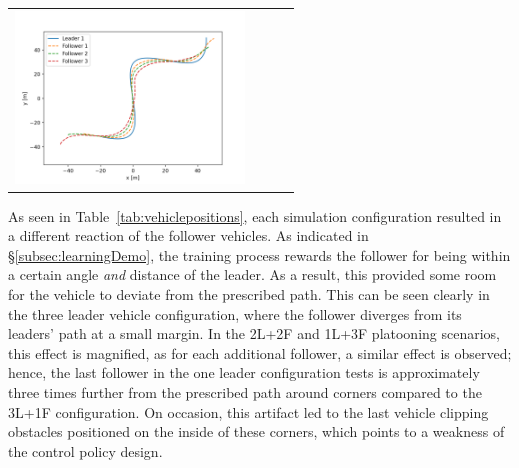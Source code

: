 \documentclass[12pt,twocolumn]{article}
\begin{document}
\begin{table}
\begin{tabular} { cccc }
        \parbox[c]{2.02in}{\includegraphics[height=1.8in]{Figs/Demonstration/1f_3i_soft_positions.png}}
    \end{tabular}
\end{table}

As seen in Table~\ref{tab:vehiclepositions}, each simulation configuration resulted in a different reaction of the follower vehicles. As indicated in \S\ref{subsec:learningDemo}, the training process rewards the follower for being within a certain angle \emph{and} distance of the leader. As a result, this provided some room for the vehicle to deviate from the prescribed path. This can be seen clearly in the three leader vehicle configuration, where the follower diverges from its leaders' path at a small margin. In the 2L+2F and 1L+3F platooning scenarios, this effect is magnified, as for each additional follower, a similar effect is observed; hence, the last follower in the one leader configuration tests is approximately three times further from the prescribed path around corners compared to the 3L+1F configuration. On occasion, this artifact led to the last vehicle clipping obstacles positioned on the inside of these corners, which points to a weakness of the control policy design.
\end{document}
